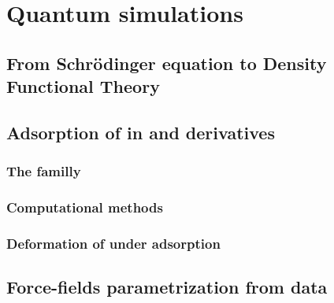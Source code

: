 \documentclass[thesis]{subfiles}
\begin{document}
\chapter{Quantum simulations}
\startcontents[chapters]
\printpartialtoc

\section{From Schrödinger equation to Density Functional Theory}


\section{Adsorption of  in  and derivatives}

\subsection{The  familly}

\subsection{Computational methods}

\subsection{Deformation of  under adsorption}

\section{Force-fields parametrization from \abinitio data}
\end{document}
